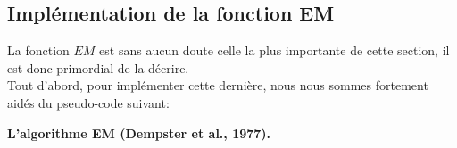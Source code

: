 \documentclass[a4paper,french,10pt]{article}
\begin{document}
\subsection{Implémentation de la fonction EM}
La fonction $EM$ est sans aucun doute celle la plus importante de cette section, il est donc primordial de la décrire. \\ 
Tout d'abord, pour implémenter cette dernière, nous nous sommes fortement aidés du pseudo-code suivant:

\begin{algorithm}
	\caption{\textbf{L’algorithme EM (Dempster et al., 1977).}}
	\begin{algorithmic}[1]
		\ENSURE
		\ENDWHILE
	\end{algorithmic}
\end{algorithm}
\end{document}
